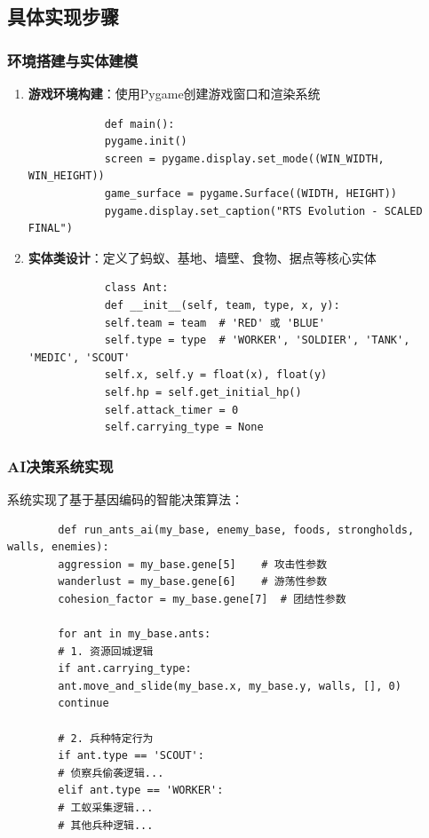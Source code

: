 \documentclass[12pt,a4paper]{article}
\begin{document}
	\subsection{具体实现步骤}
	\subsubsection{环境搭建与实体建模}
	\begin{enumerate}
		\item \textbf{游戏环境构建}：使用Pygame创建游戏窗口和渲染系统
		
		\begin{verbatim}
			def main():
			pygame.init()
			screen = pygame.display.set_mode((WIN_WIDTH, WIN_HEIGHT))
			game_surface = pygame.Surface((WIDTH, HEIGHT))
			pygame.display.set_caption("RTS Evolution - SCALED FINAL")
		\end{verbatim}
		
		\item \textbf{实体类设计}：定义了蚂蚁、基地、墙壁、食物、据点等核心实体
		
		\begin{verbatim}
			class Ant:
			def __init__(self, team, type, x, y):
			self.team = team  # 'RED' 或 'BLUE'
			self.type = type  # 'WORKER', 'SOLDIER', 'TANK', 'MEDIC', 'SCOUT'
			self.x, self.y = float(x), float(y)
			self.hp = self.get_initial_hp()
			self.attack_timer = 0
			self.carrying_type = None
		\end{verbatim}
	\end{enumerate}
	
	\subsubsection{AI决策系统实现}
	系统实现了基于基因编码的智能决策算法：
	
	\begin{verbatim}
		def run_ants_ai(my_base, enemy_base, foods, strongholds, walls, enemies):
		aggression = my_base.gene[5]    # 攻击性参数
		wanderlust = my_base.gene[6]    # 游荡性参数
		cohesion_factor = my_base.gene[7]  # 团结性参数
		
		for ant in my_base.ants:
		# 1. 资源回城逻辑
		if ant.carrying_type:
		ant.move_and_slide(my_base.x, my_base.y, walls, [], 0)
		continue
		
		# 2. 兵种特定行为
		if ant.type == 'SCOUT':
		# 侦察兵偷袭逻辑...
		elif ant.type == 'WORKER':
		# 工蚁采集逻辑...
		# 其他兵种逻辑...
	\end{verbatim}
	
\end{document}
